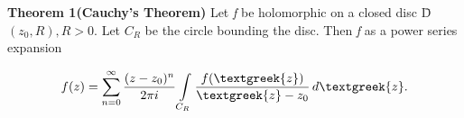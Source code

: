 \documentclass[11pt]{article}
\begin{document}
\textbf{Theorem 1{}(Cauchy's Theorem)}{} Let \textit{f} be holomorphic on a closed disc \={D}$(z_0,R),R>0$.
Let $C_R$ be the circle bounding the disc. Then \textit{f} as a power series expansion

$$
f(z) = \sum_{n=0}^{\infty}{\frac{(z-z_0)^n}{2{\pi}i}} \int\limits_{C_R} \frac{f(\textgreek{z})}{\textgreek{z} - z_0} \,d{\textgreek{z}}.
$$
\end{document}

